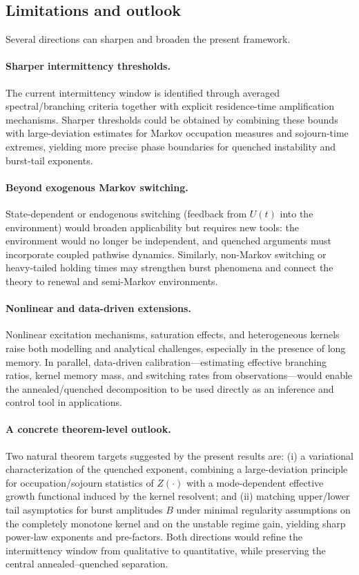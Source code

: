 \documentclass[12pt,a4paper]{article}
\theoremstyle{plain}
\theoremstyle{definition}
\theoremstyle{remark}
\begin{document}
\subsection*{Limitations and outlook}

Several directions can sharpen and broaden the present framework.

\paragraph{Sharper intermittency thresholds.}
The current intermittency window is identified through averaged spectral/branching
criteria together with explicit residence-time amplification mechanisms.
Sharper thresholds could be obtained by combining these bounds with large-deviation
estimates for Markov occupation measures and sojourn-time extremes, yielding more
precise phase boundaries for quenched instability and burst-tail exponents.

\paragraph{Beyond exogenous Markov switching.}
State-dependent or endogenous switching (feedback from $U(t)$ into the environment)
would broaden applicability but requires new tools: the environment would no longer
be independent, and quenched arguments must incorporate coupled pathwise dynamics.
Similarly, non-Markov switching or heavy-tailed holding times may strengthen burst
phenomena and connect the theory to renewal and semi-Markov environments.

\paragraph{Nonlinear and data-driven extensions.}
Nonlinear excitation mechanisms, saturation effects, and heterogeneous kernels
raise both modelling and analytical challenges, especially in the presence of
long memory.
In parallel, data-driven calibration---estimating effective branching ratios,
kernel memory mass, and switching rates from observations---would enable the
annealed/quenched decomposition to be used directly as an inference and control
tool in applications.

\paragraph{A concrete theorem-level outlook.}
Two natural theorem targets suggested by the present results are:
(i) a variational characterization of the quenched exponent, combining a
large-deviation principle for occupation/sojourn statistics of $Z(\cdot)$ with a
mode-dependent effective growth functional induced by the kernel resolvent; and
(ii) matching upper/lower tail asymptotics for burst amplitudes $B$ under minimal
regularity assumptions on the completely monotone kernel and on the unstable
regime gain, yielding sharp power-law exponents and pre-factors.
Both directions would refine the intermittency window from qualitative to
quantitative, while preserving the central annealed--quenched separation.
\end{document}
